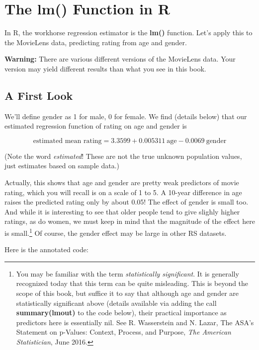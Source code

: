 \section{The lm() Function in R}

In R, the workhorse regression estimator is the \textbf{lm()} function.
Let's apply this to the MovieLens data, predicting rating from age and
gender.  

\textbf{Warning:} There are various different versions of the MovieLens
data. Your version may yield different results than what you see in this
book.

\subsection{A First Look}

We'll define gender as 1 for male, 0 for female.  We find (details
below) that our estimated regression function of rating on age and
gender is

\begin{equation}
\textrm{estimated mean rating} = 3.3599 + 0.005311 ~ \textrm{age} 
- 0.0069 ~ \textrm{gender}
\end{equation}

(Note the word \textit{estimated}! These are not the true unknown
population values, just estimates based on sample data.)

Actually, this shows that age and gender are pretty weak predictors of
movie rating, which you will recall is on a scale of 1 to 5.  A 10-year
difference in age raises the predicted rating only by about 0.05!  The
effect of gender is small too.  And while it is interesting to see that
older people tend to give slighly higher ratings, as do women, we must
keep in mind that the magnitude of the effect here is
small.\footnote{You may be familiar with the term \textit{statistically
significant}.  It is generally recognized today that this term can be
quite misleading.  This is beyond the scope of this book, but suffice it
to say that although age and gender are statistically significant above
(details available via adding the call \textbf{summary(lmout)} to the
code below), their practical importance as predictors here is
essentially nil.  See R. Wasserstein and N. Lazar, The ASA's Statement
on p-Values: Context, Process, and Purpose, \textit{The American
Statistician}, June 2016.}  Of course, the gender effect may be large in
other RS datasets.

Here is the annotated code:

